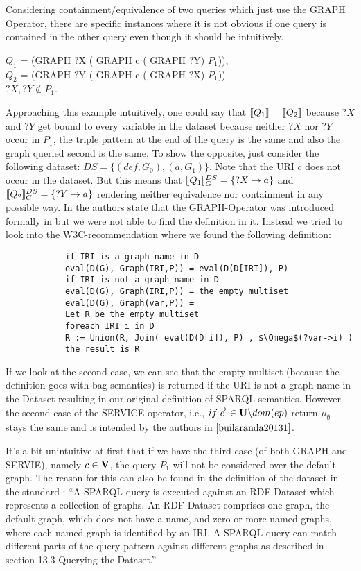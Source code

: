 			\noindent Considering containment/equivalence of two queries which just use the GRAPH
			Operator, there are specific instances where it is not obvious if one query is contained in the other query even though it should be intuitively.

			\begin{example}
				$Q_1$ = (GRAPH ?X ( GRAPH c ( GRAPH ?Y) $P_1$)),\\ 
				$Q_2$ = (GRAPH ?Y ( GRAPH c ( GRAPH ?X) $ P_1$))\\
				$?X,?Y \notin P_1$.
			\end{example}

			Approaching this example intuitively, one could say that $\llbracket Q_1 \rrbracket = \llbracket Q_2
			\rrbracket$ because $?X$ and $?Y$ get bound to every variable in the dataset because neither
			$?X$ nor $?Y$ occur in $P_1$, the triple pattern at the end
			of the query is the same and also the graph queried second is the same. 
			To show the opposite, just  consider the following dataset:
			$DS=\{(def,G_0), (a,G_1)\}$. Note that the URI $c$ does not occur in the dataset.
			But this means that $\llbracket Q_1 \rrbracket^{DS}_G = \{?X \rightarrow a\}$ and  $\llbracket Q_2
			\rrbracket^{DS}_G = \{?Y \rightarrow a\}$ rendering neither equivalence nor containment
			in any possible way.
			In \cite{builaranda20131} the authors
			state that the GRAPH-Operator was introduced formally
			in \cite{perez2009semantics} but we were not able to find the definition
			in it.
			Instead we tried to look into the W3C-recommendation\cite{w3standard} 
			where we found the following definition:
			\begin{lstlisting}
			if IRI is a graph name in D
			eval(D(G), Graph(IRI,P)) = eval(D(D[IRI]), P)
			if IRI is not a graph name in D
			eval(D(G), Graph(IRI,P)) = the empty multiset
			eval(D(G), Graph(var,P)) =
			Let R be the empty multiset
			foreach IRI i in D
			R := Union(R, Join( eval(D(D[i]), P) , $\Omega$(?var->i) )
			the result is R
			\end{lstlisting}

			If we look at the second case, we can see that the empty multiset (because the
			definition goes with bag semantics)
			is returned if the URI is not a graph name in the Dataset resulting
			in our original definition of SPARQL semantics. However the second
			case of the SERVICE-operator, i.e., $ if \overrightarrow{c} \in \mathbf{U} \backslash dom(ep)$ return
			$\mu_\emptyset$ stays the same and is intended by the authors in
			$\cite{builaranda20131}$.

			It's a bit unintuitive at first that if we have
			the third case (of both GRAPH and SERVIE), 
			namely $c \in \mathbf{V}$, the query $P_1$ will not be considered over the
			default graph. The reason for this can also be found in the definition of the
			dataset in the standard \cite{w3standard}:
			``A SPARQL query is executed against an RDF Dataset which represents a collection
			of graphs. An RDF Dataset comprises one graph, the default graph, which does not
			have a name, and zero or more named graphs, where each named graph is identified
			by an IRI. A SPARQL query can match different parts of the query pattern against
			different graphs as described in section 13.3 Querying the Dataset.''

